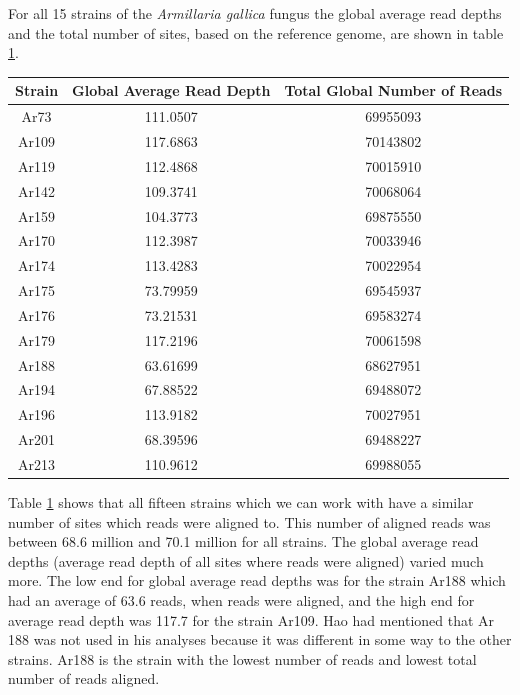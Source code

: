 \documentclass[../main.tex]{subfiles}
\begin{document}
%
%

For all 15 strains of the \textit{Armillaria gallica} fungus the global average read depths and the total number of sites, based on the reference genome, are shown in table \ref{tab:avg_rd}.  

\begin{table}[H]
	\begin{center}
		 \label{tab:avg_rd}
		\vspace{0.5cm}
		\begin{tabular}{ |c|c|c| }
			\hline
			Strain & Global Average Read Depth & Total Global Number of Reads \\
			\hline
			Ar73 & 111.0507 & 69955093\\
			\hline
			Ar109 & 117.6863 & 70143802\\
			\hline
			Ar119 & 112.4868 & 70015910\\
			\hline
			Ar142 & 109.3741 & 70068064\\
			\hline
			Ar159 & 104.3773 & 69875550\\
			\hline
			Ar170 & 112.3987 & 70033946\\
			\hline
			Ar174 & 113.4283 & 70022954\\
			\hline
			Ar175 & 73.79959 & 69545937\\
			\hline
			Ar176 & 73.21531 & 69583274\\
			\hline
			Ar179 & 117.2196 & 70061598\\
			\hline
			Ar188 & 63.61699 & 68627951\\
			\hline
			Ar194 & 67.88522 & 69488072\\
			\hline
			Ar196 & 113.9182 & 70027951\\
			\hline
			Ar201 & 68.39596 & 69488227\\
			\hline
			Ar213 & 110.9612 & 69988055\\
			\hline
		\end{tabular}
	\end{center}
\end{table}

Table \ref{tab:avg_rd} shows that all fifteen strains which we can work with have a similar number of sites which reads were aligned to. This number of aligned reads was between 68.6 million and 70.1 million for all strains. The global average read depths (average read depth of all sites where reads were aligned) varied much more. The low end for global average read depths was for the strain Ar188 which had an average of 63.6 reads, when reads were aligned, and the high end for average read depth was 117.7 for the strain Ar109. Hao had mentioned that Ar 188 was not used in his analyses because it was different in some way to the other strains. Ar188 is the strain with the lowest number of reads and lowest total number of reads aligned.
\end{document}
